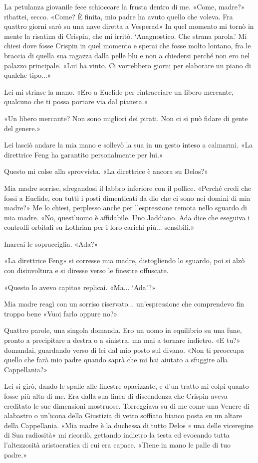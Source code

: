 La petulanza giovanile fece schioccare la frusta dentro di me. «Come,
madre?» ribattei, secco. «Come? È finita, mio padre ha avuto quello che
voleva. Fra quattro giorni sarò su una nave diretta a Vesperad» In quel
momento mi tornò in mente la risatina di Crispin, che mi irritò.
`Anagnostico. Che strana parola.' Mi chiesi dove fosse Crispin in quel
momento e sperai che fosse molto lontano, fra le braccia di quella sua
ragazza dalla pelle blu e non a chiedersi perché non ero nel palazzo
principale. «Lui ha vinto. Ci vorrebbero giorni per elaborare un piano
di qualche tipo...»

Lei mi strinse la mano. «Ero a Euclide per rintracciare un libero
mercante, qualcuno che ti possa portare via dal pianeta.»

«Un libero mercante? Non sono migliori dei pirati. Non ci si può fidare
di gente del genere.»

Lei lasciò andare la mia mano e sollevò la sua in un gesto inteso a
calmarmi. «La direttrice Feng ha garantito personalmente per lui.»

Questo mi colse alla sprovvista. «La direttrice è ancora su Delos?»

Mia madre sorrise, sfregandosi il labbro inferiore con il pollice.
«Perché credi che fossi a Euclide, con tutti i posti dimenticati da dio
che ci sono nei domini di mia madre?» Me lo chiesi, perplesso anche per
l'espressione remota nello sguardo di mia madre. «No, quest'uomo è
affidabile. Uno Jaddiano. Ada dice che eseguiva i controlli orbitali su
Lothrian per i loro carichi più... sensibili.»

Inarcai le sopracciglia. «Ada?»

«La direttrice Feng» si corresse mia madre, distogliendo lo sguardo, poi
si alzò con disinvoltura e si diresse verso le finestre offuscate.

«Questo lo avevo capito» replicai. «Ma... `Ada'?»

Mia madre reagì con un sorriso riservato... un'espressione che
comprendevo fin troppo bene «Vuoi farlo oppure no?»

Quattro parole, una singola domanda. Ero un uomo in equilibrio su una
fune, pronto a precipitare a destra o a sinistra, ma mai a tornare
indietro. «E tu?» domandai, guardando verso di lei dal mio posto sul
divano. «Non ti preoccupa quello che farà mio padre quando saprà che mi
hai aiutato a sfuggire alla Cappellania?»

Lei si girò, dando le spalle alle finestre opacizzate, e d'un tratto mi
colpì quanto fosse più alta di me. Era dalla sua linea di discendenza
che Crispin aveva ereditato le sue dimensioni mostruose. Torreggiava su
di me come una Venere di alabastro o un'icona della Giustizia di vetro
soffiato bianco posta su un altare della Cappellania. «Mia madre è la
duchessa di tutto Delos \emph{e} una delle viceregine di Sua radiosità»
mi ricordò, gettando indietro la testa ed evocando tutta l'altezzosità
aristocratica di cui era capace. «Tiene in mano le palle di tuo padre.»

